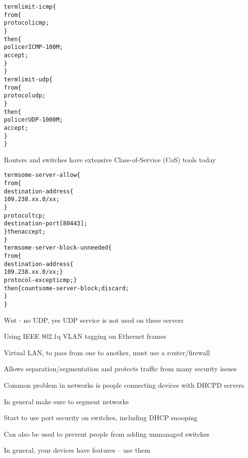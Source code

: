 \documentclass[Screen16to9,17pt]{foils}
\begin{document}

\begin{alltt}\footnotesize
term limit-icmp \{
    from \{
        protocol icmp;
    \}
    then \{
        policer ICMP-100M;
        accept;
    \}
\}
term limit-udp \{
    from \{
        protocol udp;
    \}
    then \{
        policer UDP-1000M;
        accept;
    \}
\}
\end{alltt}

Routers and switches have extensive Class-of-Service (CoS) tools today


\begin{alltt}\footnotesize
term some-server-allow \{
    from \{
        destination-address \{
            109.238.xx.0/xx;
        \}
        protocol tcp;
        destination-port [ 80 443 ];
    \} then accept;
\}
term some-server-block-unneeded \{
    from \{
        destination-address \{
            109.238.xx.0/xx; \}
        protocol-except icmp;  \}
    then \{ count some-server-block; discard;
    \}
\}
\end{alltt}

Wut - no UDP, yes UDP service is not used on these servers



\begin{list1}
\item Using IEEE 802.1q  VLAN tagging on Ethernet frames
\item Virtual LAN, to pass from one to another, must use a router/firewall
\item Allows separation/segmentation and protects traffic from many security issues
\end{list1}



\begin{list1}
\item Common problem in networks is people connecting devices with DHCPD servers
\item In general make sure to segment networks
\item Start to use port security on switches, including DHCP snooping\\
\item Can also be used to prevent people from adding unmanaged switches
\item In general, your devices have features -- use them
\end{list1}
\end{document}
